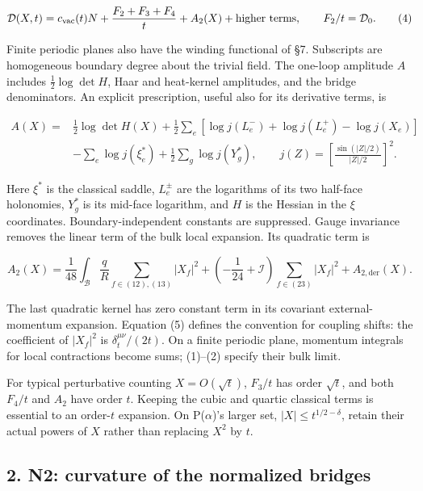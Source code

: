 \documentclass[11pt,a4paper]{article}
\begin{document}
\[\mathcal D(X,t)=c_{\rm vac}(t)N+\frac{F_2+F_3+F_4}{t}
 +A_2(X)+\text{higher terms},\qquad F_2/t=\mathcal D_0.\tag{4}\]

Finite periodic planes also have the winding functional of §7.
Subscripts are homogeneous boundary degree about the trivial field. The
one-loop amplitude \(A\) includes \(\tfrac12\log\det H\), Haar and
heat-kernel amplitudes, and the bridge denominators. An explicit
prescription, useful also for its derivative terms, is

\[\begin{aligned}
A(X)={}&\tfrac12\log\det H(X)
 +\tfrac12\sum_e[\log j(L_e^-)+\log j(L_e^+)-\log j(X_e)]\\
 &-\sum_e\log j(\xi_e^*)+\tfrac12\sum_g\log j(Y_g^*),
\qquad j(Z)=\left[\frac{\sin(|Z|/2)}{|Z|/2}\right]^2.
\end{aligned}\]

Here \(\xi^*\) is the classical saddle, \(L_e^\pm\) are the logarithms
of its two half-face holonomies, \(Y_g^*\) is its mid-face logarithm,
and \(H\) is the Hessian in the \(\xi\) coordinates.
Boundary-independent constants are suppressed. Gauge invariance removes
the linear term of the bulk local expansion. Its quadratic term is

\[A_2(X)=\frac1{48}\int_{\mathcal B}\frac qR
 \sum_{f\in(12),(13)}|X_f|^2
 +\left(-\frac1{24}+\mathcal I\right)
 \sum_{f\in(23)}|X_f|^2+A_{2,\mathrm{der}}(X).\tag{5}\]

The last quadratic kernel has zero constant term in its covariant
external-momentum expansion. Equation (5) defines the convention for
coupling shifts: the coefficient of \(|X_f|^2\) is
\(\delta_t^{\mu\nu}/(2t)\). On a finite periodic plane, momentum
integrals for local contractions become sums; (1)--(2) specify their
bulk limit.

For typical perturbative counting \(X=O(\sqrt t)\), \(F_3/t\) has order
\(\sqrt t\), and both \(F_4/t\) and \(A_2\) have order \(t\). Keeping
the cubic and quartic classical terms is essential to an order-\(t\)
expansion. On P(\(\alpha\))'s larger set, \(|X|\le t^{1/2-\delta}\),
retain their actual powers of \(X\) rather than replacing \(X^2\) by
\(t\).

\hypertarget{n2-curvature-of-the-normalized-bridges}{%
\subsection{2. N2: curvature of the normalized
bridges}\label{n2-curvature-of-the-normalized-bridges}}
\end{document}
